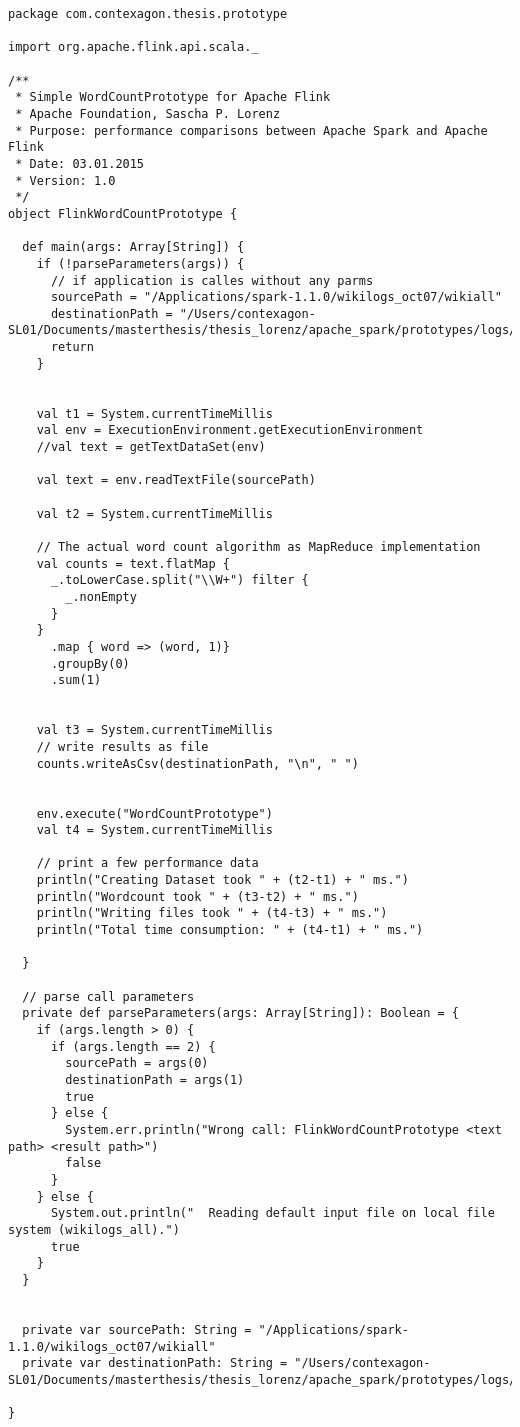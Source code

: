 \begin{lstlisting}[label=flink config,caption=WordCountPrototyp für Apache Flink als MapReduce-Implementierung]
package com.contexagon.thesis.prototype

import org.apache.flink.api.scala._

/**
 * Simple WordCountPrototype for Apache Flink
 * Apache Foundation, Sascha P. Lorenz
 * Purpose: performance comparisons between Apache Spark and Apache Flink
 * Date: 03.01.2015
 * Version: 1.0
 */
object FlinkWordCountPrototype {

  def main(args: Array[String]) {
    if (!parseParameters(args)) {
      // if application is calles without any parms
      sourcePath = "/Applications/spark-1.1.0/wikilogs_oct07/wikiall"
      destinationPath = "/Users/contexagon-SL01/Documents/masterthesis/thesis_lorenz/apache_spark/prototypes/logs/flinkOutput.out"
      return
    }


    val t1 = System.currentTimeMillis
    val env = ExecutionEnvironment.getExecutionEnvironment
    //val text = getTextDataSet(env)

    val text = env.readTextFile(sourcePath)

    val t2 = System.currentTimeMillis

    // The actual word count algorithm as MapReduce implementation
    val counts = text.flatMap {
      _.toLowerCase.split("\\W+") filter {
        _.nonEmpty
      }
    }
      .map { word => (word, 1)}
      .groupBy(0)
      .sum(1)


    val t3 = System.currentTimeMillis
    // write results as file
    counts.writeAsCsv(destinationPath, "\n", " ")


    env.execute("WordCountPrototype")
    val t4 = System.currentTimeMillis

    // print a few performance data
    println("Creating Dataset took " + (t2-t1) + " ms.")
    println("Wordcount took " + (t3-t2) + " ms.")
    println("Writing files took " + (t4-t3) + " ms.")
    println("Total time consumption: " + (t4-t1) + " ms.")

  }

  // parse call parameters
  private def parseParameters(args: Array[String]): Boolean = {
    if (args.length > 0) {
      if (args.length == 2) {
        sourcePath = args(0)
        destinationPath = args(1)
        true
      } else {
        System.err.println("Wrong call: FlinkWordCountPrototype <text path> <result path>")
        false
      }
    } else {
      System.out.println("  Reading default input file on local file system (wikilogs_all).")
      true
    }
  }


  private var sourcePath: String = "/Applications/spark-1.1.0/wikilogs_oct07/wikiall"
  private var destinationPath: String = "/Users/contexagon-SL01/Documents/masterthesis/thesis_lorenz/apache_spark/prototypes/logs/flinkOutput.out"

}
\end{lstlisting}


